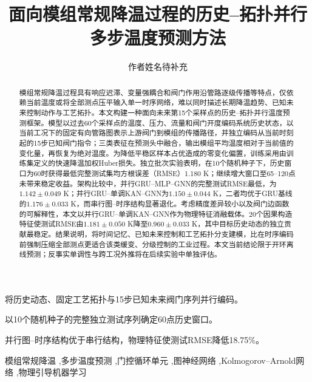 \documentclass[a4paper,fleqn]{cas-dc}
\begin{document}
\let\WriteBookmarks\relax
\def\floatpagepagefraction{1}
\def\textpagefraction{.001}


\title[mode=title]{面向模组常规降温过程的历史--拓扑并行多步温度预测方法}

\author[1]{作者姓名待补充}
\cormark[1]

\begin{abstract}
模组常规降温过程具有响应迟滞、变量强耦合和阀门作用沿管路逐级传播等特点，仅依赖当前温度或将全部测点压平输入单一时序网络，难以同时描述长期降温趋势、已知未来控制动作与工艺拓扑。本文构建一种面向未来第15个采样点的历史--拓扑并行温度预测框架。模型以过去60个采样点的温度、压力、流量和阀门开度编码系统历史状态，以当前工况下的固定有向管路图表示上游阀门到模组的传播路径，并独立编码从当前时刻起的15步已知阀门指令；三类表征在预测头中融合，输出模组平均温度相对于当前值的变化量，再恢复为绝对温度。为降低平稳区样本占优造成的零变化偏置，训练采用由训练集定义的快速降温加权Huber损失。独立批次实验表明，在10个随机种子下，历史窗口为60时获得最低完整测试集均方根误差（RMSE）1.180 K；继续增大窗口至65--120点未带来稳定收益。架构比较中，并行GRU--MLP--GNN的完整测试RMSE最低，为$1.142\pm0.049$ K；并行GRU--单调KAN--GNN为$1.150\pm0.044$ K，二者均优于GRU基线的$1.176\pm0.033$ K，而串行图--时序结构显著退化。考虑精度差异较小以及阀门边函数的可解释性，本文以并行GRU--单调KAN--GNN作为物理特征消融载体。20个因果构造特征使测试RMSE由$1.181\pm0.050$ K降至$0.960\pm0.033$ K，其中目标历史动态的独立贡献最稳定。结果说明，将时间记忆、已知未来控制和工艺拓扑分支建模，比在时序编码前强制压缩全部测点更适合该类缓变、分级控制的工业过程。本文当前结论限于开环离线预测；反事实单调性与跨工况外推将在后续实验中单独评估。
\end{abstract}

\begin{highlights}
\item 将历史动态、固定工艺拓扑与15步已知未来阀门序列并行编码。
\item 以10个随机种子的完整独立测试序列确定60点历史窗口。
\item 并行图--时序结构优于串行结构，物理特征使测试RMSE降低18.75\%。
\end{highlights}

\begin{keywords}
模组常规降温 \sep 多步温度预测 \sep 门控循环单元 \sep 图神经网络 \sep Kolmogorov--Arnold网络 \sep 物理引导机器学习
\end{keywords}
\end{document}

